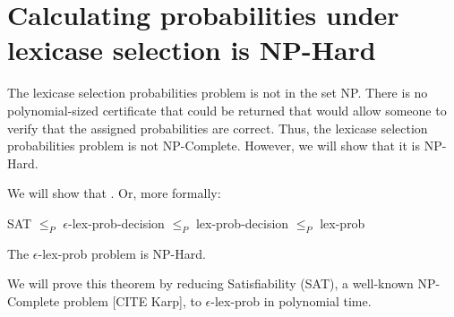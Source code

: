 \documentclass[sigconf]{acmart}
\begin{document}
\section{Calculating probabilities under lexicase selection is NP-Hard}

The lexicase selection probabilities problem is not in the set NP. There is no polynomial-sized certificate that could be returned that would allow someone to verify that the assigned probabilities are correct. Thus, the lexicase selection probabilities problem is not NP-Complete. However, we will show that it is NP-Hard.

We will show that . Or, more formally:

{\sc SAT} $\leq_{P}$ {\sc $\epsilon$-lex-prob-decision} $\leq_{P}$ {\sc lex-prob-decision} $\leq_{P}$ {\sc lex-prob}

\begin{theorem}
\label{lexicasetheorem}
The {\sc $\epsilon$-lex-prob} problem is NP-Hard.
\end{theorem}

We will prove this theorem by reducing Satisfiability ({\sc SAT}), a well-known NP-Complete problem [CITE Karp], to {\sc $\epsilon$-lex-prob} in polynomial time.
\end{document}
